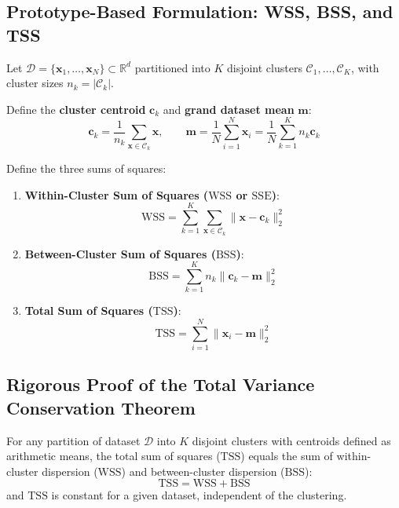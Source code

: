 \subsection{Prototype-Based Formulation: WSS, BSS, and TSS}
Let $\mathcal{D} = \{\mathbf{x}_1, \dots, \mathbf{x}_N\} \subset \mathbb{R}^d$ partitioned into $K$ disjoint clusters $\mathcal{C}_1, \dots, \mathcal{C}_K$, with cluster sizes $n_k = |\mathcal{C}_k|$.

Define the \textbf{cluster centroid} $\mathbf{c}_k$ and \textbf{grand dataset mean} $\mathbf{m}$:
\begin{equation}
\label{eq:dm-centroids-definitions-en}
\mathbf{c}_k = \frac{1}{n_k} \sum_{\mathbf{x} \in \mathcal{C}_k} \mathbf{x}, \qquad \mathbf{m} = \frac{1}{N} \sum_{i=1}^N \mathbf{x}_i = \frac{1}{N} \sum_{k=1}^K n_k \mathbf{c}_k
\end{equation}

Define the three sums of squares:
\begin{enumerate}
    \item \textbf{Within-Cluster Sum of Squares ($\mathrm{WSS}$ or $\mathrm{SSE}$)}:
    \begin{equation}
    \label{eq:dm-wss-definition-en}
    \mathrm{WSS} = \sum_{k=1}^K \sum_{\mathbf{x} \in \mathcal{C}_k} \|\mathbf{x} - \mathbf{c}_k\|_2^2
    \end{equation}
    
    \item \textbf{Between-Cluster Sum of Squares ($\mathrm{BSS}$)}:
    \begin{equation}
    \label{eq:dm-bss-definition-en}
    \mathrm{BSS} = \sum_{k=1}^K n_k \|\mathbf{c}_k - \mathbf{m}\|_2^2
    \end{equation}
    
    \item \textbf{Total Sum of Squares ($\mathrm{TSS}$)}:
    \begin{equation}
    \label{eq:dm-tss-definition-en}
    \mathrm{TSS} = \sum_{i=1}^N \|\mathbf{x}_i - \mathbf{m}\|_2^2
    \end{equation}
\end{enumerate}

\subsection{Rigorous Proof of the Total Variance Conservation Theorem}
\begin{theorem}
\label{thm:dm-tss-wss-bss-en}
For any partition of dataset $\mathcal{D}$ into $K$ disjoint clusters with centroids defined as arithmetic means, the total sum of squares ($\mathrm{TSS}$) equals the sum of within-cluster dispersion ($\mathrm{WSS}$) and between-cluster dispersion ($\mathrm{BSS}$):
\begin{equation}
\label{eq:dm-tss-conservation-en}
\mathrm{TSS} = \mathrm{WSS} + \mathrm{BSS}
\end{equation}
and $\mathrm{TSS}$ is constant for a given dataset, independent of the clustering.
\end{theorem}

